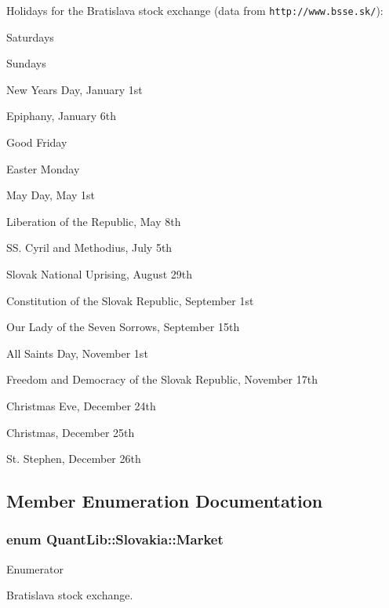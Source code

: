 Holidays for the Bratislava stock exchange (data from {\tt http\+://www.\+bsse.\+sk/})\+: 
\begin{DoxyItemize}
\item Saturdays 
\item Sundays 
\item New Year\textquotesingle{}s Day, January 1st 
\item Epiphany, January 6th 
\item Good Friday 
\item Easter Monday 
\item May Day, May 1st 
\item Liberation of the Republic, May 8th 
\item SS. Cyril and Methodius, July 5th 
\item Slovak National Uprising, August 29th 
\item Constitution of the Slovak Republic, September 1st 
\item Our Lady of the Seven Sorrows, September 15th 
\item All Saints Day, November 1st 
\item Freedom and Democracy of the Slovak Republic, November 17th 
\item Christmas Eve, December 24th 
\item Christmas, December 25th 
\item St. Stephen, December 26th 
\end{DoxyItemize}

\subsection{Member Enumeration Documentation}
\subsubsection[{Market}]{\setlength{\rightskip}{0pt plus 5cm}enum {\bf Quant\+Lib\+::\+Slovakia\+::\+Market}}\label{class_quant_lib_1_1_slovakia_a24697fdb2e58dded90d27cb36e00efe4}
\begin{Desc}
\item[Enumerator]\par
\begin{description}
\item[{\em 
B\+S\+SE\label{class_quant_lib_1_1_slovakia_a24697fdb2e58dded90d27cb36e00efe4a651a04e8818f76fa8d218a241c9832b5}
}]Bratislava stock exchange. \end{description}
\end{Desc}


